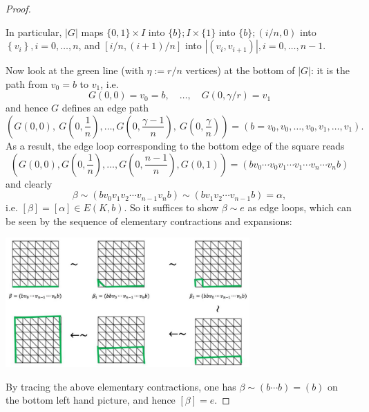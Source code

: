 \begin{proof}
\begin{center}
\end{center}
\vspace{-3mm}
In particular, \(\left| G\right|\) maps \(\{ 0,1\}  \times  I\) into \(\{ b\} ;I \times  \{ 1\}\) into \(\{ b\} ;\left( {i/n,0}\right)\) into \(\left\{  {v}_{i}\right\} ,i = 0,\ldots,n\), and \(\left\lbrack  {i/n,\left( {i + 1}\right) /n}\right\rbrack\) into \(\left| \left( {{v}_{i},{v}_{i + 1}}\right) \right|,i = 0,\ldots,n - 1\).

Now look at the green line (with $\eta:=r/n$ vertices) at the bottom of $|G|$: it is the path from $v_0 = b$ to $v_1$, i.e.
$$G(0,0) = v_0 = b, \quad \dots, \quad G(0,\gamma/r) = v_1$$
and hence $G$ defines an edge path
\[
\left(G(0,0),\ G(0,\frac{1}{n}), \dots, G(0,\frac{\gamma-1}{n}),\ G(0,\frac{\gamma}{n})\right) = (b = v_0, v_0, \dots, v_0, v_1, \dots, v_1).
\]
As a result, the edge loop corresponding to the bottom edge of the square reads 
\[\left(G(0,0), G(0,\frac{1}{n}), \dots, G(0,\frac{n-1}{n}), G(0,1)\right) = \left( {b{v}_{0}\cdots {v}_{0}{v}_{1}\cdots {v}_{1}\cdots {v}_{n}\cdots {v}_{n}b}\right)\]
and clearly
\[
\beta  \sim  \left( {b{v}_{0}{v}_{1}{v}_{2}\cdots {v}_{n - 1}{v}_{n}b}\right)
\sim  \left( {b{v}_{1}{v}_{2}\cdots {v}_{n - 1}b}\right)  = \alpha, 
\]
i.e. $[\beta] = [\alpha] \in E(K,b)$. So it suffices to show \(\beta  \sim  e\) as edge loops, which can be seen by the sequence of elementary contractions and expansions:
\vspace{-2mm}
\begin{center}
\includegraphics[width=0.7\textwidth]{images/Ch8_edge_equivalence.jpg}
\end{center}
By tracing the above elementary contractions, one has \(\beta  \sim  \left( {b\cdots b}\right)  = \left( b\right)\) on the bottom left hand picture, and hence $[\beta] = e$.
\end{proof}

